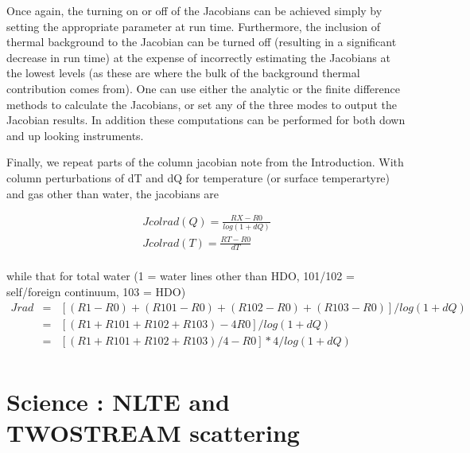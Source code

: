 \documentclass[12pt]{article}
\begin{document}
{{{{Once again, the turning on or off of the Jacobians can be achieved
simply by setting the appropriate parameter at run time.  Furthermore,
the inclusion of thermal background to the Jacobian can be turned off
(resulting in a significant decrease in run time) at the expense of
incorrectly estimating the Jacobians at the lowest levels (as these
are where the bulk of the background thermal contribution comes from).
One can use either the analytic or the finite difference methods to
calculate the Jacobians, or set any of the three modes to output the
Jacobian results.  In addition these computations can be performed for
both down and up looking instruments.

Finally, we repeat parts of the column jacobian note from the
Introduction. With column perturbations of dT and dQ for temperature
(or surface temperartyre) and gas other than water, the jacobians are

\begin{eqnarray*}
Jcolrad(Q) = \frac{RX-R0}{log(1+dQ)} \\
Jcolrad(T) = \frac{RT-R0}{dT} \\
\end{eqnarray*}

while that for total water (1 = water lines other than HDO, 101/102 = self/foreign continuum, 103 = HDO)
\begin{eqnarray*}
Jrad  & = & [(R1-R0) + (R101-R0) + (R102-R0) + (R103-R0)]/log(1+dQ) \\
   & = & [(R1+R101+R102+R103)-4R0]/log(1+dQ) \\
   & = & [(R1+R101+R102+R103)/4-R0] * 4/log(1+dQ) \\
\end{eqnarray*}

\section{Science : NLTE and TWOSTREAM scattering}
}}}}
\end{document}
